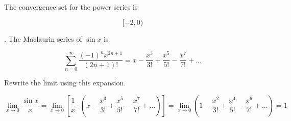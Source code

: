 \documentclass{article}
\begin{document}
\hfill

\noindent The convergence set for the power series is

\[\boxed{[-2, 0)}\]

\hfill

. The Maclaurin series of $\sin x$ is

\[\sum_{n=0}^{\infty}\frac{(-1)^nx^{2n+1}}{(2n+1)!}=x-\frac{x^3}{3!}+\frac{x^5}{5!}-\frac{x^7}{7!}+...\]

\hfill

\noindent Rewrite the limit using this expansion.

\[\lim_{x\to0}\frac{\sin x}{x}=\lim_{x\to0}\left[\frac1x\cdot \left(x-\frac{x^3}{3!}+\frac{x^5}{5!}-\frac{x^7}{7!}+...\right)\right]=\lim_{x\to0}\left(1-\frac{x^2}{3!}+\frac{x^4}{5!}-\frac{x^6}{7!}+...\right)=\boxed{1}\]

\hfill
\end{document}
